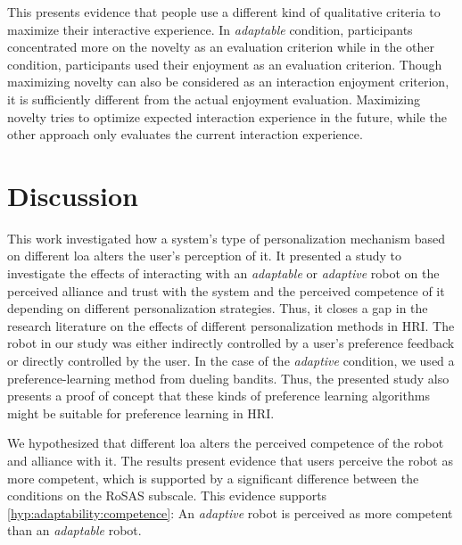 \documentclass[twocolumn]{svjour3}          %
\begin{document}
This presents evidence that people use a different kind of qualitative criteria to maximize their interactive experience. In \textit{adaptable} condition, participants concentrated more on the novelty as an evaluation criterion while in the other condition, participants used their enjoyment as an evaluation criterion. Though maximizing novelty can also be considered as an interaction enjoyment criterion, it is sufficiently different from the actual enjoyment evaluation. Maximizing novelty tries to optimize expected interaction experience in the future, while the other approach only evaluates the current interaction experience.


\section{Discussion}\label{discussion}
This work investigated how a system's type of personalization mechanism
based on different \gls{loa} alters the user's perception of it. It presented
a study to investigate the effects of interacting with an \textit{adaptable} or
\textit{adaptive} robot on the perceived alliance and trust with the system and
the perceived competence of it depending on different personalization
strategies. Thus, it closes a gap in the research literature on the
effects of different personalization methods in HRI. The robot in our
study was either indirectly controlled by a user's preference feedback
or directly controlled by the user. In the case of the \textit{adaptive}
condition, we used a preference-learning method from dueling bandits.
Thus, the presented study also presents a proof of concept that these
kinds of preference learning algorithms might be suitable for preference
learning in HRI.

We hypothesized that different \gls{loa} alters the perceived competence of
the robot and alliance with it. The results present evidence that
users perceive the robot as more competent, which is supported by a
significant difference between the conditions on the RoSAS subscale.
This evidence supports \ref{hyp:adaptability:competence}: An \textit{adaptive}
robot is perceived as more competent than an \textit{adaptable} robot.
\end{document}
